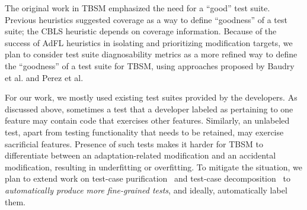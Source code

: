 The original work in TBSM emphasized the need for a ``good'' test suite. Previous heuristics suggested coverage as a way to define “goodness” of a test suite; the CBLS heuristic depends on coverage information. Because of the success of AdFL heuristics in isolating and prioritizing modification targets, we plan to consider test suite diagnosability metrics as a more refined way to define the “goodness” of a test suite for TBSM, using approaches proposed by Baudry et al. and Perez et al.~\cite{Baudry2006improving,perez2017diagnosibility}

For our work, we mostly used existing test suites provided by the developers. As discussed above, sometimes a test that a developer labeled as pertaining to one feature may contain code that exercises other features. Similarly, an unlabeled test, apart from testing functionality that needs to be retained, may exercise sacrificial features.  Presence of such tests makes it harder for TBSM to differentiate between an adaptation-related modification and an accidental modification, resulting in underfitting or overfitting. To mitigate the situation, we plan to extend work on test-case purification~\cite{xuan2014test}  and test-case decomposition~\cite{stvrcausereduce,christi18reduce} to \emph{automatically produce more fine-grained tests}, and ideally, automatically label them.
